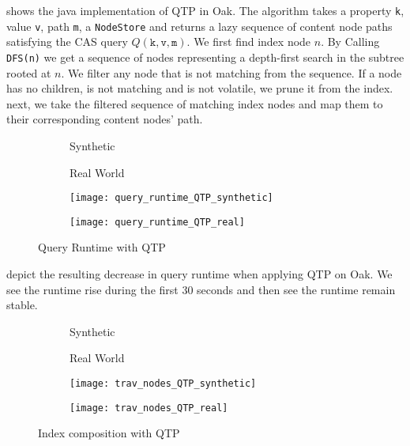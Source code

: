 \message{ !name(thesis.tex)}\documentclass[abstracton,12pt]{scrartcl}
\theoremstyle{definition}
\begin{document}
 shows the java implementation of QTP in Oak. The algorithm
takes a property \texttt{k}, value \texttt{v}, path \texttt{m}, a
\texttt{NodeStore} and returns a lazy sequence of content node paths satisfying
the CAS query $Q(\texttt{k},\texttt{v},\texttt{m})$. We first find index node
$n$. By Calling \texttt{DFS(n)} we get a sequence of nodes representing a
depth-first search in the subtree rooted at $n$. We filter any node that is not
matching from the sequence. If a node has no children, is not matching and is
not volatile, we prune it from the index. next, we take the filtered sequence of
matching index nodes and map them to their corresponding content nodes' path.

\begin{figure}[H]
  \centering
  \begin{subfigure}{0.49\linewidth}
    \centering Synthetic
  \end{subfigure}
  \begin{subfigure}{0.49\linewidth}
    \centering Real World
  \end{subfigure}
  \begin{subfigure}{0.49\linewidth}
    \texttt{[image: query\_runtime\_QTP\_synthetic]}
    \caption{}
    \label{fig:query_runtime_QTP_synthetic}
  \end{subfigure}
  \begin{subfigure}{0.49\linewidth}
    \texttt{[image: query\_runtime\_QTP\_real]}
    \caption{}
    \label{fig:query_runtime_QTP_real}
  \end{subfigure}
  \caption{Query Runtime with QTP}
\end{figure}

 depict the
resulting decrease in query runtime when applying QTP on Oak. We see the runtime
rise during the first 30 seconds and then see the runtime remain stable.

\begin{figure}[H]
  \centering
  \begin{subfigure}{0.49\linewidth}
    \centering Synthetic
  \end{subfigure}
  \begin{subfigure}{0.49\linewidth}
    \centering Real World
  \end{subfigure}
  \begin{subfigure}{0.49\linewidth}
    \texttt{[image: trav\_nodes\_QTP\_synthetic]}
    \caption{}
    \label{fig:trav_nodes_QTP_synthetic}
  \end{subfigure}
  \begin{subfigure}{0.49\linewidth}
    \texttt{[image: trav\_nodes\_QTP\_real]}
    \caption{}
    \label{fig:trav_nodes_QTP_real}
  \end{subfigure}
  \caption{Index composition with QTP}
\end{figure}
\end{document}
